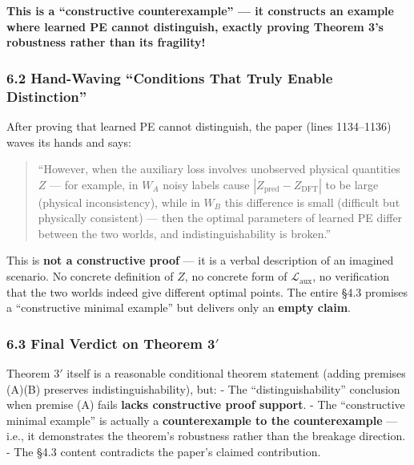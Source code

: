 \documentclass[
  12pt,
]{article}
\begin{document}
\textbf{This is a ``constructive counterexample'' --- it constructs an example where learned PE cannot distinguish, exactly proving Theorem 3's robustness rather than its fragility!}

\subsubsection{6.2 Hand-Waving ``Conditions That Truly Enable Distinction''}\label{hand-waving-conditions}

After proving that learned PE cannot distinguish, the paper (lines 1134--1136) waves its hands and says:
\begin{quote}
``However, when the auxiliary loss involves unobserved physical quantities $Z$ --- for example, in $W_A$ noisy labels cause $|Z_{\text{pred}} - Z_{\text{DFT}}|$ to be large (physical inconsistency), while in $W_B$ this difference is small (difficult but physically consistent) --- then the optimal parameters of learned PE differ between the two worlds, and indistinguishability is broken.''
\end{quote}

This is \textbf{not a constructive proof} --- it is a verbal description of an imagined scenario. No concrete definition of $Z$, no concrete form of $\mathcal{L}_{\text{aux}}$, no verification that the two worlds indeed give different optimal points. The entire \S4.3 promises a ``constructive minimal example'' but delivers only an \textbf{empty claim}.

\subsubsection{6.3 Final Verdict on Theorem 3$'$}\label{final-verdict-thm-3prime}

Theorem 3$'$ itself is a reasonable conditional theorem statement (adding premises (A)(B) preserves indistinguishability), but:
- The ``distinguishability'' conclusion when premise (A) fails \textbf{lacks constructive proof support}.
- The ``constructive minimal example'' is actually a \textbf{counterexample to the counterexample} --- i.e., it demonstrates the theorem's robustness rather than the breakage direction.
- The \S4.3 content contradicts the paper's claimed contribution.
\end{document}
